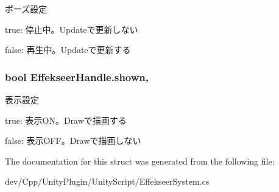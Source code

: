 ポーズ設定 

true\-: 停止中。\-Updateで更新しない

false\-: 再生中。\-Updateで更新する\hypertarget{struct_effekseer_handle_a96d0ebfe4cab721aaea0992b1750ae43}{
\subsubsection[{shown}]{\setlength{\rightskip}{0pt plus 5cm}bool Effekseer\-Handle.\-shown\hspace{0.3cm}{\ttfamily [get]}, {\ttfamily [set]}}}\label{struct_effekseer_handle_a96d0ebfe4cab721aaea0992b1750ae43}


表示設定 

true\-: 表示\-O\-N。\-Drawで描画する

false\-: 表示\-O\-F\-F。\-Drawで描画しない

The documentation for this struct was generated from the following file\-:\begin{DoxyCompactItemize}
\item 
dev/\-Cpp/\-Unity\-Plugin/\-Unity\-Script/Effekseer\-System.\-cs\end{DoxyCompactItemize}
